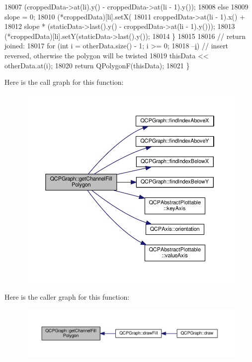 \begin{DoxyCode}
18007               (croppedData->at(li).y() - croppedData->at(li - 1).y());
18008     \textcolor{keywordflow}{else}
18009       slope = 0;
18010     (*croppedData)[li].setX(
18011         croppedData->at(li - 1).x() +
18012         slope * (staticData->last().y() - croppedData->at(li - 1).y()));
18013     (*croppedData)[li].setY(staticData->last().y());
18014   \}
18015 
18016   \textcolor{comment}{// return joined:}
18017   \textcolor{keywordflow}{for} (\textcolor{keywordtype}{int} i = otherData.size() - 1; i >= 0;
18018        --\hyperlink{_comparision_pictures_2_createtest_image_8m_a6f6ccfcf58b31cb6412107d9d5281426}{i}) \textcolor{comment}{// insert reversed, otherwise the polygon will be twisted}
18019     thisData << otherData.at(i);
18020   \textcolor{keywordflow}{return} QPolygonF(thisData);
18021 \}
\end{DoxyCode}


Here is the call graph for this function\+:\nopagebreak
\begin{figure}[H]
\begin{center}
\leavevmode
\includegraphics[width=350pt]{class_q_c_p_graph_a0374b7268e35cab9802a6be2b5d726d7_cgraph}
\end{center}
\end{figure}




Here is the caller graph for this function\+:\nopagebreak
\begin{figure}[H]
\begin{center}
\leavevmode
\includegraphics[width=350pt]{class_q_c_p_graph_a0374b7268e35cab9802a6be2b5d726d7_icgraph}
\end{center}
\end{figure}


